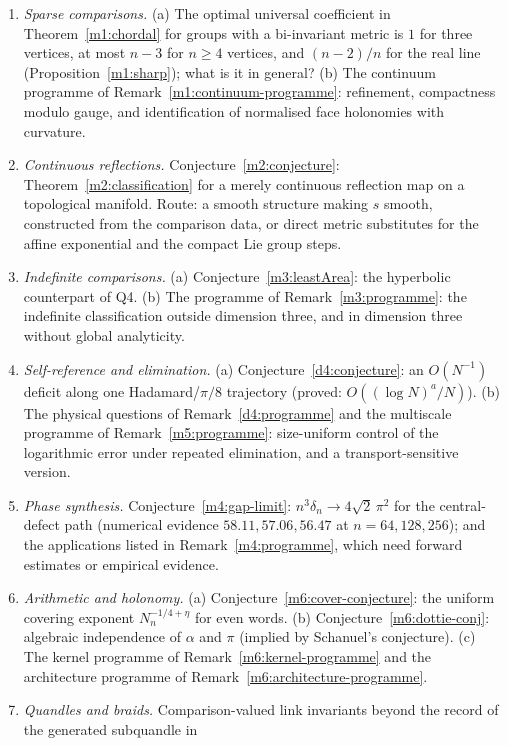 \documentclass[11pt,reqno]{amsart}
\theoremstyle{definition}
\theoremstyle{remark}
\numberwithin{equation}{section}
\begin{document}
\begin{enumerate}[label=\textbf{Q\arabic*.},leftmargin=2.6em]
\cite{Morrey48,Osserman70,Gulliver73,Hildebrandt69,HH70}, and for piecewise $C^3$ curves the corners need a separate argument.
\item \emph{Sparse comparisons.}  (a) The optimal universal coefficient in Theorem~\ref{m1:chordal} for groups with a bi-invariant metric
is $1$ for three vertices, at most $n-3$ for $n\ge4$ vertices, and $(n-2)/n$ for the real line (Proposition~\ref{m1:sharp}); what is it in
general?  (b) The continuum programme of Remark~\ref{m1:continuum-programme}: refinement, compactness modulo gauge, and identification of
normalised face holonomies with curvature.
\item \emph{Continuous reflections.}  Conjecture~\ref{m2:conjecture}: Theorem~\ref{m2:classification} for a merely continuous reflection
map on a topological manifold.  Route: a smooth structure making $s$ smooth, constructed from the comparison data, or direct metric
substitutes for the affine exponential and the compact Lie group steps.
\item \emph{Indefinite comparisons.}  (a) Conjecture~\ref{m3:leastArea}: the hyperbolic counterpart of Q4.  (b) The programme of
Remark~\ref{m3:programme}: the indefinite classification outside dimension three, and in dimension three without global analyticity.
\item \emph{Self-reference and elimination.}  (a) Conjecture~\ref{d4:conjecture}: an $O(N^{-1})$ deficit along one Hadamard/$\pi/8$
trajectory (proved: $O((\log N)^a/N)$).  (b) The physical questions of Remark~\ref{d4:programme} and the multiscale programme of
Remark~\ref{m5:programme}: size-uniform control of the logarithmic error under repeated elimination, and a transport-sensitive version.
\item \emph{Phase synthesis.}  Conjecture~\ref{m4:gap-limit}: $n^3\delta_n\to4\sqrt2\,\pi^2$ for the central-defect path (numerical evidence
$58.11,57.06,56.47$ at $n=64,128,256$); and the applications listed in Remark~\ref{m4:programme}, which need forward estimates or
empirical evidence.
\item \emph{Arithmetic and holonomy.}  (a) Conjecture~\ref{m6:cover-conjecture}: the uniform covering exponent $N_n^{-1/4+\eta}$ for
even words.  (b) Conjecture~\ref{m6:dottie-conj}: algebraic independence of $\alpha$ and $\pi$ (implied by Schanuel's conjecture).
(c) The kernel programme of Remark~\ref{m6:kernel-programme} and the architecture programme of Remark~\ref{m6:architecture-programme}.
\item \emph{Quandles and braids.}  Comparison-valued link invariants beyond the record of the generated subquandle in

\end{enumerate}
\end{document}
